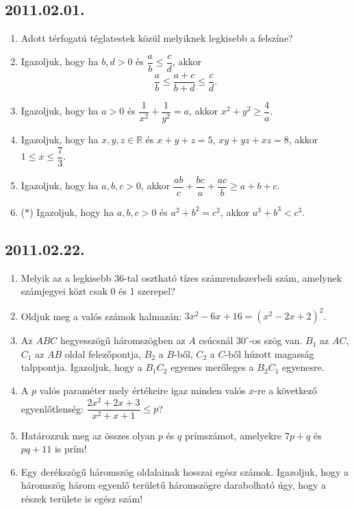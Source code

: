 \documentclass{article}
\begin{document}
\subsection*{2011.02.01.}
\begin{enumerate}
\item Adott térfogatú téglatestek közül melyiknek legkisebb a felszíne?
\item Igazoljuk, hogy ha $b,d>0$ és $\dfrac{a}{b}\le \dfrac{c}{d}$, akkor
$$\dfrac{a}{b}\le\dfrac{a+c}{b+d}\le\dfrac{c}{d}.$$
\item Igazoljuk, hogy ha $a>0$ és $\dfrac{1}{x^2}+\dfrac{1}{y^2}=a$, akkor
$x^2+y^2\ge\dfrac{4}{a}$.
\item Igazoljuk, hogy ha $x,y,z\in\mathbb{R}$ és $x+y+z=5$, $xy+yz+xz=8$, akkor
$1\le x\le \dfrac{7}{3}$.
\item Igazoljuk, hogy ha $a,b,c>0$, akkor $\dfrac{ab}{c}+\dfrac{bc}{a}+\dfrac{ac}{b}\ge a+b+c$.
\item ($*$) Igazoljuk, hogy ha $a,b,c>0$ és $a^2+b^2=c^2$, akkor $a^3+b^3<c^3$.
\end{enumerate}

\subsection*{2011.02.22.}
\begin{enumerate}
\item Melyik az a legkisebb 36-tal osztható tízes számrendszerbeli szám, amelynek számjegyei közt csak 0 és 1 szerepel?
\item Oldjuk meg a valós számok halmazán: $3x^2-6x+16=(x^2-2x+2)^2$.
\item Az $ABC$ hegyesszögű háromszögben az $A$ csúcsnál $30^\circ$-os szög van. $B_1$ az $AC$, $C_1$ az $AB$ oldal felezőpontja, $B_2$ a $B$-ből, $C_2$ a $C$-ből húzott magasság talppontja. Igazoljuk, hogy a $B_1C_2$ egyenes merőleges a $B_2C_1$ egyenesre.
\item A $p$ valós paraméter mely értékeire igaz minden valós $x$-re a következő egyenlőtlenség: $\dfrac{2x^2+2x+3}{x^2+x+1}\le p$?
\item Határozzuk meg az összes olyan $p$ és $q$ prímszámot, amelyekre $7p+q$ és 
$pq+11$ is prím!
\item Egy derékszögű háromszög oldalainak hosszai egész számok. Igazoljuk, hogy a háromszög három egyenlő területű háromszögre darabolható úgy, hogy a részek területe is egész szám!
\end{enumerate}
\end{document}
